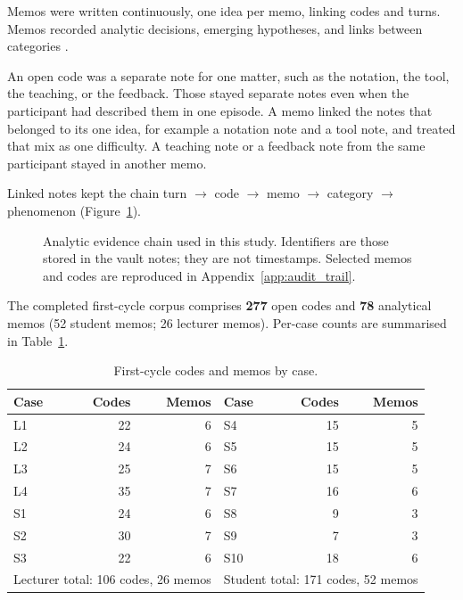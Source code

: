 Memos were written continuously, one idea per memo, linking codes and turns. Memos recorded analytic decisions, emerging hypotheses, and links between categories \cite{adolph2011using,stol2016grounded}.

An open code was a separate note for one matter, such as the notation, the tool, the teaching, or the feedback. Those stayed separate notes even when the participant had described them in one episode. A memo linked the notes that belonged to its one idea, for example a notation note and a tool note, and treated that mix as one difficulty. A teaching note or a feedback note from the same participant stayed in another memo.

Linked notes kept the chain turn $\rightarrow$ code $\rightarrow$ memo $\rightarrow$ category $\rightarrow$ phenomenon (Figure~\ref{fig:evidence_chain}).

\begin{figure}[htbp]
\centering

\caption{Analytic evidence chain used in this study. Identifiers are those stored in the vault notes; they are not timestamps. Selected memos and codes are reproduced in Appendix~\ref{app:audit_trail}.}
\label{fig:evidence_chain}
\end{figure}

The completed first-cycle corpus comprises \textbf{277} open codes and \textbf{78} analytical memos (52 student memos; 26 lecturer memos). Per-case counts are summarised in Table~\ref{tab:code_memo_counts}.

\begin{table}[t]
\centering
\small
\caption{First-cycle codes and memos by case.}
\label{tab:code_memo_counts}
\begin{tabular}{lrr lrr}
\toprule
\textbf{Case} & \textbf{Codes} & \textbf{Memos} & \textbf{Case} & \textbf{Codes} & \textbf{Memos} \\
\midrule
L1 & 22 & 6 & S4 & 15 & 5 \\
L2 & 24 & 6 & S5 & 15 & 5 \\
L3 & 25 & 7 & S6 & 15 & 5 \\
L4 & 35 & 7 & S7 & 16 & 6 \\
S1 & 24 & 6 & S8 & 9 & 3 \\
S2 & 30 & 7 & S9 & 7 & 3 \\
S3 & 22 & 6 & S10 & 18 & 6 \\
\midrule
\multicolumn{3}{l}{Lecturer total: 106 codes, 26 memos} & \multicolumn{3}{l}{Student total: 171 codes, 52 memos} \\
\bottomrule
\end{tabular}
\end{table}

